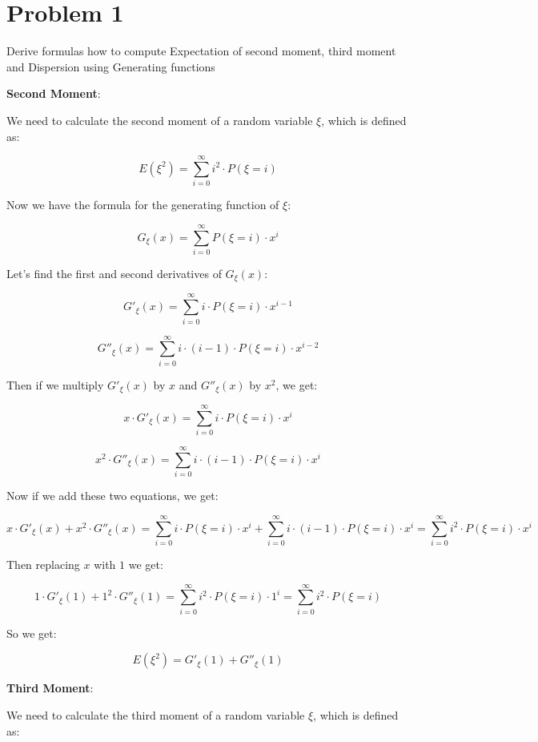 \section*{Problem 1}

Derive formulas how to compute Expectation of second moment, third moment and Dispersion using Generating functions

\textbf{Second Moment}:

We need to calculate the second moment of a random variable \( \xi \), which is defined as:

\[ E(\xi^2) = \sum_{i=0}^{\infty} i^2 \cdot P(\xi = i) \]

Now we have the formula for the generating function of \( \xi \):

\[ G_{\xi}(x) = \sum_{i=0}^{\infty} P(\xi = i) \cdot x^i \]

Let's find the first and second derivatives of \( G_{\xi}(x) \):


\[ G'_{\xi}(x) = \sum_{i=0}^{\infty} i \cdot P(\xi = i) \cdot x^{i-1} \]

\[ G''_{\xi}(x) = \sum_{i=0}^{\infty} i \cdot (i-1) \cdot P(\xi = i) \cdot x^{i-2} \]

Then if we multiply \( G'_\xi(x) \) by \( x \) and \( G''_\xi(x) \) by \( x^2 \), we get:

\[ x \cdot G'_{\xi}(x) = \sum_{i=0}^{\infty} i \cdot P(\xi = i) \cdot x^{i} \]

\[ x^2 \cdot G''_{\xi}(x) = \sum_{i=0}^{\infty} i \cdot (i-1) \cdot P(\xi = i) \cdot x^{i} \]

Now if we add these two equations, we get:

\[ x \cdot G'_{\xi}(x) + x^2 \cdot G''_{\xi}(x) = \sum_{i=0}^{\infty} i \cdot P(\xi = i) \cdot x^{i} + \sum_{i=0}^{\infty} i \cdot (i-1) \cdot P(\xi = i) \cdot x^{i} = \sum_{i=0}^{\infty} i^2 \cdot P(\xi = i) \cdot x^{i} \]

Then replacing $x$ with $1$ we get:

\[ 1 \cdot G'_{\xi}(1) + 1^2 \cdot G''_{\xi}(1) = \sum_{i=0}^{\infty} i^2 \cdot P(\xi = i) \cdot 1^{i} = \sum_{i=0}^{\infty} i^2 \cdot P(\xi = i) \]

So we get:

\[ E(\xi^2) = G'_{\xi}(1) + G''_{\xi}(1) \]

\newpage

\textbf{Third Moment}:

We need to calculate the third moment of a random variable \( \xi \), which is defined as:

